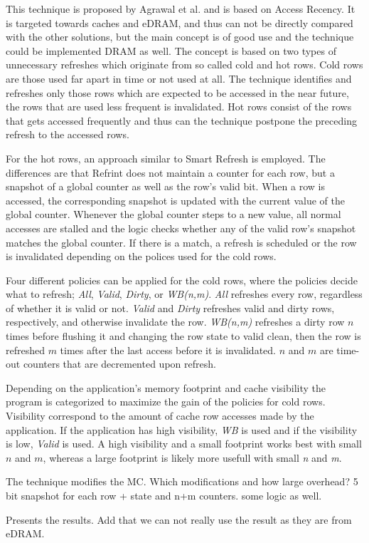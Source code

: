 This technique is proposed by Agrawal et al. \cite{refrint} and is based on Access Recency. It is targeted towards caches and eDRAM, and thus can not be directly compared with the other solutions, but the main concept is of good use and the technique could be implemented DRAM as well. The concept is based on two types of unnecessary refreshes which originate from so called cold and hot rows. Cold rows are those used far apart in time or not used at all. The technique identifies and refreshes only those rows which are expected to be accessed in the near future, the rows that are used less frequent is invalidated. Hot rows consist of the rows that gets accessed frequently and thus can the technique postpone the preceding refresh to the accessed rows.

For the hot rows, an approach similar to Smart Refresh is employed. The differences are that Refrint does not maintain a counter for each row, but a snapshot of a global counter as well as the row's valid bit. When a row is accessed, the corresponding snapshot is updated with the current value of the global counter. Whenever the global counter steps to a new value, all normal accesses are stalled and the logic checks whether any of the valid row's snapshot  matches the global counter. If there is a match, a refresh is scheduled or the row is invalidated depending on the polices used for the cold rows. 

Four different policies can be applied for the cold rows, where the policies decide what to refresh; \textit{All}, \textit{Valid}, \textit{Dirty}, or \textit{WB(n,m)}. \textit{All} refreshes every row, regardless of whether it is valid or not. \textit{Valid} and \textit{Dirty} refreshes valid and dirty rows, respectively, and otherwise invalidate the row. \textit{WB(n,m)} refreshes a dirty row $n$ times before flushing it and changing the row state to valid clean, then the row is refreshed $m$ times after the last access before it is invalidated. $n$ and $m$ are time-out counters that are decremented upon refresh.


Depending on the application's memory footprint and cache visibility the program is categorized to maximize the gain of the policies for cold rows. Visibility correspond to the amount of cache row accesses made by the application. If the application has high visibility, \textit{WB} is used and if the visibility is low, \textit{Valid} is used. A high visibility and a small footprint works best with small $n$ and $m$, whereas a large footprint is likely more usefull with small \textit{n} and \textit{m}. 

The technique modifies the MC. Which modifications and how large overhead? 5 bit snapshot for each row + state and n+m counters. some logic as well.

Presents the results. Add that we can not really use the result as they are from eDRAM.
